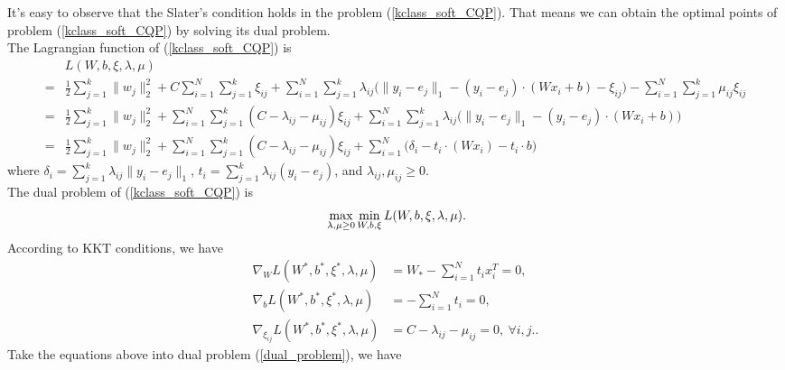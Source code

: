 It's easy to observe that the Slater's condition holds in the problem (\ref{kclass_soft_CQP}). That means we can obtain the optimal points of problem (\ref{kclass_soft_CQP}) by solving its dual problem.\\
The Lagrangian function of (\ref{kclass_soft_CQP}) is
\begin{equation}
\begin{aligned}
	&L(W,b,\xi,\lambda,\mu) \\
	= &\frac{1}{2}\displaystyle\sum_{j=1}^k \|w_j\|_2^2+C\displaystyle\sum_{i=1}^N\displaystyle\sum_{j=1}^k \xi_{ij} + \displaystyle\sum_{i=1}^N\displaystyle\sum_{j=1}^k \lambda_{ij}\Big(\|y_i - e_j\|_1 - (y_i - e_j)\cdot (Wx_i+b)-\xi_{ij}\Big) - \displaystyle\sum_{i=1}^N\displaystyle\sum_{j=1}^k \mu_{ij} \xi_{ij}\\
	= &\frac{1}{2}\displaystyle\sum_{j=1}^k \|w_j\|_2^2 + \displaystyle\sum_{i=1}^N\displaystyle\sum_{j=1}^k (C-\lambda_{ij}-\mu_{ij})\xi_{ij} + \displaystyle\sum_{i=1}^N\displaystyle\sum_{j=1}^k \lambda_{ij}\Big(\|y_i - e_j\|_1 - (y_i - e_j)\cdot (Wx_i+b)\Big)\\
	= &\frac{1}{2}\displaystyle\sum_{j=1}^k \|w_j\|_2^2 + \displaystyle\sum_{i=1}^N\displaystyle\sum_{j=1}^k (C-\lambda_{ij}-\mu_{ij})\xi_{ij} + \displaystyle\sum_{i=1}^N\Big(\delta_i-t_i\cdot (Wx_i)-t_i\cdot b\Big)
\end{aligned}
\end{equation}
where $\delta_i = \sum_{j=1}^k\lambda_{ij}\|y_i - e_j\|_1$, $t_i = \sum_{j=1}^k\lambda_{ij}(y_i - e_j)$, and $\lambda_{ij},\mu_{ij}\geq 0$.\\
The dual problem of (\ref{kclass_soft_CQP}) is 
\begin{equation}{\label{dual_problem}}
\max_{\lambda,\mu\geq 0} \min_{W,b,\xi} L(W,b,\xi,\lambda,\mu). 
\end{equation}
According to KKT conditions, we have 
\begin{equation}
\begin{aligned}
\nabla_{W}L(W^*,b^*,\xi^*,\lambda,\mu) &= W_* - \displaystyle\sum_{i=1}^N t_ix_i^{T} = 0,\\
\nabla_{b}L(W^*,b^*,\xi^*,\lambda,\mu)  &= -\displaystyle\sum_{i=1}^N t_i = 0,\\
\nabla_{\xi_{ij}}L(W^*,b^*,\xi^*,\lambda,\mu)  &= C-\lambda_{ij}-\mu_{ij} = 0,~\forall i,j..
\end{aligned}
\end{equation}
Take the equations above into dual problem (\ref{dual_problem}), we have
